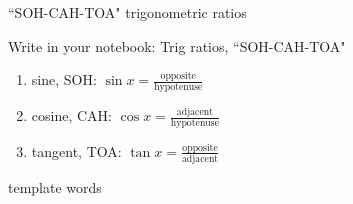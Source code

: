 \begin{frame}{``SOH-CAH-TOA" trigonometric ratios}
  \begin{block}{Write in your notebook: Trig ratios, ``SOH-CAH-TOA"}
    \begin{enumerate}
        \item sine, SOH: $\displaystyle \sin x = \frac{\text{opposite}} {\text{hypotenuse}}$
        \item cosine, CAH: $\displaystyle \cos x = \frac{\text{adjacent}} {\text{hypotenuse}}$
        \item tangent, TOA: $\displaystyle \tan x = \frac{\text{opposite}} {\text{adjacent}}$
    \end{enumerate}
    \end{block}
\end{frame}


\begin{frame}{template}
  words
\end{frame}



